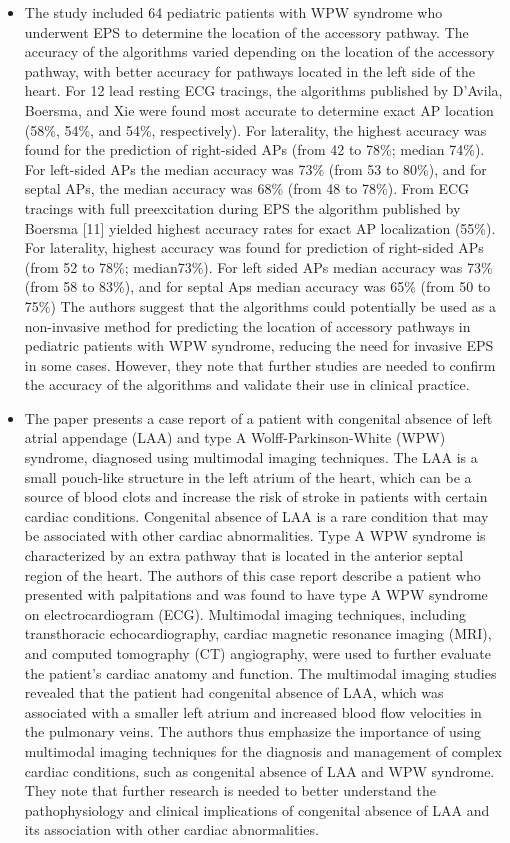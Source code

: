 \begin{itemize}
	\item The study included 64 pediatric patients with WPW syndrome who underwent EPS to determine the location of the accessory pathway. The accuracy of the algorithms varied depending on the location of the accessory pathway, with better accuracy for pathways located in the left side of the heart. For 12 lead resting ECG tracings, the algorithms published by D’Avila, Boersma, and Xie were found most accurate to determine exact AP location (58\%, 54\%, and 54\%, respectively). For laterality, the highest accuracy was found for the prediction of right-sided APs (from 42 to 78\%; median 74\%). For left-sided APs the median accuracy was 73\% (from 53 to 80\%), and for septal APs, the median accuracy was 68\% (from 48 to 78\%). From ECG tracings with full preexcitation during EPS the algorithm published by Boersma [11] yielded highest accuracy rates for exact AP localization (55\%). For laterality, highest accuracy was found for prediction of right-sided APs (from 52 to 78\%; median73\%). For left sided APs median accuracy was 73\% (from 58 to 83\%), and for septal Aps median accuracy was 65\% (from 50 to 75\%) The authors suggest that the algorithms could potentially be used as a non-invasive method for predicting the location of accessory pathways in pediatric patients with WPW syndrome, reducing the need for invasive EPS in some cases. However, they note that further studies are needed to confirm the accuracy of the algorithms and validate their use in clinical practice. 
	
	\item The paper presents a case report of a patient with congenital absence of left atrial appendage (LAA) and type A Wolff-Parkinson-White (WPW) syndrome, diagnosed using multimodal imaging techniques. The LAA is a small pouch-like structure in the left atrium of the heart, which can be a source of blood clots and increase the risk of stroke in patients with certain cardiac conditions. Congenital absence of LAA is a rare condition that may be associated with other cardiac abnormalities. Type A WPW syndrome is characterized by an extra pathway that is located in the anterior septal region of the heart. The authors of this case report describe a patient who presented with palpitations and was found to have type A WPW syndrome on electrocardiogram (ECG). Multimodal imaging techniques, including transthoracic echocardiography, cardiac magnetic resonance imaging (MRI), and computed tomography (CT) angiography, were used to further evaluate the patient's cardiac anatomy and function. The multimodal imaging studies revealed that the patient had congenital absence of LAA, which was associated with a smaller left atrium and increased blood flow velocities in the pulmonary veins. The authors thus emphasize the importance of using multimodal imaging techniques for the diagnosis and management of complex cardiac conditions, such as congenital absence of LAA and WPW syndrome. They note that further research is needed to better understand the pathophysiology and clinical implications of congenital absence of LAA and its association with other cardiac abnormalities. 
	

\end{itemize}
